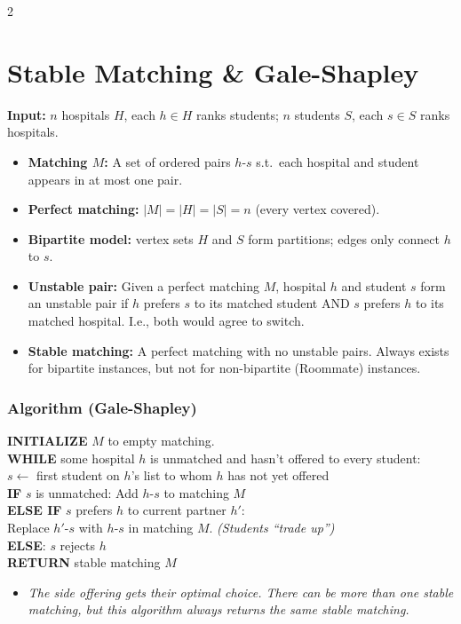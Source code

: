 \documentclass[9pt]{article}
\begin{document}
\begin{multicols}{2}

\section*{Stable Matching \& Gale-Shapley}

\textbf{Input:} $n$ hospitals $H$, each $h\in H$ ranks students; $n$ students $S$, each $s\in S$ ranks hospitals.
\begin{itemize}
  \item \textbf{Matching $M$:} A set of ordered pairs $h$-$s$ s.t.\ each hospital and student appears in at most one pair.
  \item \textbf{Perfect matching:} $|M|=|H|=|S|=n$ (every vertex covered).
  \item \textbf{Bipartite model:} vertex sets $H$ and $S$ form partitions; edges only connect $h$ to $s$.
  \item \textbf{Unstable pair:} Given a perfect matching $M$, hospital $h$ and student $s$ form an unstable pair if $h$ prefers $s$ to its matched student AND $s$ prefers $h$ to its matched hospital. I.e., both would agree to switch.
  \item \textbf{Stable matching:} A perfect matching with no unstable pairs. Always exists for bipartite instances, but not for non-bipartite (Roommate) instances.
\end{itemize}

\subsubsection*{Algorithm (Gale-Shapley)}

\textbf{INITIALIZE} $M$ to empty matching.\\
\textbf{WHILE} some hospital $h$ is unmatched and hasn't offered to every student:\\
\hspace*{8pt}$s\leftarrow$ first student on $h$'s list to whom $h$ has not yet offered\\
\hspace*{8pt}\textbf{IF} $s$ is unmatched: Add $h$-$s$ to matching $M$\\
\hspace*{8pt}\textbf{ELSE IF} $s$ prefers $h$ to current partner $h'$:\\
\hspace*{16pt}Replace $h'$-$s$ with $h$-$s$ in matching $M$. \textit{(Students ``trade up'')}\\
\hspace*{8pt}\textbf{ELSE}: $s$ rejects $h$\\
\textbf{RETURN} stable matching $M$
\begin{itemize}
  \item \textit{The side offering gets their optimal choice. There can be more than one stable matching, but this algorithm always returns the same stable matching.}
\end{itemize}


\end{multicols}
\end{document}
